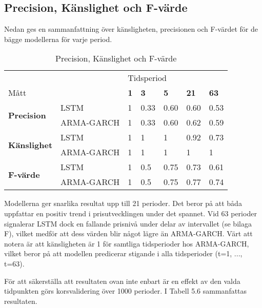 \documentclass[11pt]{article}
\numberwithin{equation}{section}
\numberwithin{table}{section}
\numberwithin{figure}{section}
\begin{document}
\subsection{Precision, Känslighet och F-värde}
Nedan ges en sammanfattning över känsligheten, precisionen och F-värdet för de bägge modellerna för varje period.

\begin{table}[H]
\caption{Precision, Känslighet och F-värde}
\begin{tabular}{||lllllll||}
\hline
                                     &            & \multicolumn{5}{l||}{Tidsperiod}                                  \\
Mått                                 &            & \textbf{1} & \textbf{3} & \textbf{5} & \textbf{21} & \textbf{63} \\ \hline\hline
\multirow{2}{*}{\textbf{Precision}} & LSTM       & 1          & 0.33       & 0.60       & 0.60        & 0.53        \\
                                     & ARMA-GARCH & 1          & 0.33       & 0.60       & 0.62        & 0.59        \\ \cline{2-7} 
\multirow{2}{*}{\textbf{Känslighet}}  & LSTM       & 1          & 1          & 1          & 0.92           & 0.73       \\
                                     & ARMA-GARCH & 1          & 1          & 1          & 1           & 1           \\ \cline{2-7} 
\multirow{2}{*}{\textbf{F-värde}}    & LSTM       & 1          & 0.5        & 0.75       & 0.73       & 0.61       \\
                                     & ARMA-GARCH & 1          & 0.5        & 0.75       & 0.77       & 0.74        \\ \hline
\end{tabular}
\end{table}

Modellerna ger snarlika resultat upp till 21 perioder. Det beror på att båda uppfattar en positiv trend i prisutvecklingen under det spannet. Vid 63 perioder signalerar LSTM dock en fallande prisnivå under delar av intervallet (se bilaga F), vilket medför att dess värden blir något lägre än ARMA-GARCH. Värt att notera är att känsligheten är 1 för samtliga tidsperioder hos ARMA-GARCH, vilket beror på att modellen predicerar stigande i alla tidsperioder (t=1, ..., t=63).

För att säkerställa att resultaten ovan inte enbart är en effekt av den valda tidpunkten görs korsvalidering över 1000 perioder. I Tabell 5.6 sammanfattas resultaten.
\end{document}
